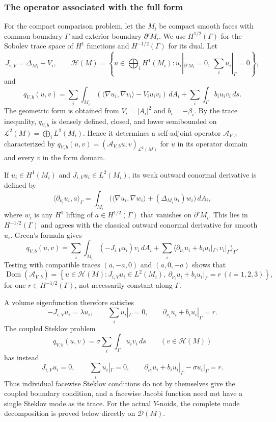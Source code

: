 \documentclass[11pt,twoside]{amsart}
\numberwithin{equation}{section}
\begin{document}
\subsubsection*{The operator associated with the full form}
For the compact comparison problem, let the $M_i$ be compact smooth faces with common boundary $\Gamma$ and exterior boundary $\partial'M_i$. We use $H^{1/2}(\Gamma)$ for the Sobolev trace space of $H^1$ functions and $H^{-1/2}(\Gamma)$ for its dual. Let
\[
J_{i,V}=\Delta_{M_i}+V_i,
\qquad
\mathcal H(M)=\left\{u\in\bigoplus_iH^1(M_i):
u_i|_{\partial'M_i}=0,\ \sum_i u_i|_\Gamma=0\right\},
\]
and
\[
q_{V,b}(u,v)=\sum_i\int_{M_i}(\langle\nabla u_i,\nabla v_i\rangle-V_iu_iv_i)\,dA_i
+\sum_i\int_\Gamma b_i u_iv_i\,ds.
\]
The geometric form is obtained from $V_i=|A_i|^2$ and $b_i=-\beta_i$. By the trace inequality, $q_{V,b}$ is densely defined, closed, and lower semibounded on $\mathscr L^2(M)=\bigoplus_iL^2(M_i)$. Hence it determines a self-adjoint operator $\mathscr A_{V,b}$ characterized by $q_{V,b}(u,v)=(\mathscr A_{V,b}u,v)_{\mathscr L^2(M)}$ for $u$ in its operator domain and every $v$ in the form domain.

If $u_i\in H^1(M_i)$ and $J_{i,V}u_i\in L^2(M_i)$, its weak outward conormal derivative is defined by
\[
\langle\partial_{\nu_i}u_i,a\rangle_\Gamma
=\int_{M_i}\bigl(\langle\nabla u_i,\nabla w_i\rangle+(\Delta_{M_i}u_i)w_i\bigr)\,dA_i,
\]
where $w_i$ is any $H^1$ lifting of $a\in H^{1/2}(\Gamma)$ that vanishes on $\partial'M_i$. This lies in $H^{-1/2}(\Gamma)$ and agrees with the classical outward conormal derivative for smooth $u_i$. Green's formula gives
\[
q_{V,b}(u,v)=\sum_i\int_{M_i}(-J_{i,V}u_i)v_i\,dA_i
+\sum_i\langle\partial_{\nu_i}u_i+b_i u_i|_\Gamma,v_i|_\Gamma\rangle_\Gamma.
\]
Testing with compatible traces $(a,-a,0)$ and $(a,0,-a)$ shows that
\[
\operatorname{Dom}(\mathscr A_{V,b})
=\left\{u\in\mathcal H(M):J_{i,V}u_i\in L^2(M_i),\ 
\partial_{\nu_i}u_i+b_i u_i|_\Gamma=r\ (i=1,2,3)\right\},
\]
for one $r\in H^{-1/2}(\Gamma)$, not necessarily constant along $\Gamma$.

A volume eigenfunction therefore satisfies
\[
-J_{i,V}u_i=\lambda u_i,
\qquad \sum_i u_i|_\Gamma=0,
\qquad \partial_{\nu_i}u_i+b_i u_i|_\Gamma=r.
\]
The coupled Steklov problem
\[
q_{V,b}(u,v)=\sigma\sum_i\int_\Gamma u_i v_i\,ds
\qquad(v\in\mathcal H(M))
\]
has instead
\[
J_{i,V}u_i=0,
\qquad \sum_i u_i|_\Gamma=0,
\qquad \partial_{\nu_i}u_i+b_i u_i|_\Gamma-\sigma u_i|_\Gamma=r.
\]
Thus individual facewise Steklov conditions do not by themselves give the coupled boundary condition, and a facewise Jacobi function need not have a single Steklov mode as its trace. For the actual $Y$-noids, the complete mode decomposition is proved below directly on $\mathcal D(M)$.
\end{document}
